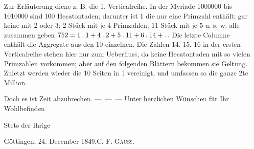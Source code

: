 Zur Erläuterung diene z. B. die 1. Verticalreihe. In der Myriade 1000000 bis 1010000 sind 100 Hecatontaden; darunter ist 1 die nur eine Primzahl enthält; gar keine mit 2 oder 3; 2 Stück mit je 4 Primzahlen; 11 Stück mit je 5 u. s. w. alle zusammen geben $752=1\mathbin{.}1+4\mathbin{.}2+5\mathbin{.}11+6\mathbin{.}14+\mathinner{.\,.}$ Die letzte Columne enthält die Aggregate aus den 10 einzelnen. Die Zahlen 14. 15. 16 in der ersten Verticalreihe stehen hier nur zum Ueberfluss, da keine Hecatontaden mit so vielen Primzahlen vorkommen; aber auf den folgenden Blättern bekommen sie Geltung. Zuletzt werden wieder die 10 Seiten in 1 vereinigt, und umfassen so die ganze 2te Million.

Doch es ist Zeit abzubrechen. \mbox{— — —} Unter herzlichen Wünschen für Ihr Wohlbefinden
\begin{center}Stets der Ihrige\end{center}
\noindent Göttingen, 24. December 1849.\hfill C. F. \textsc{Gauss}.
\par\endgroup
